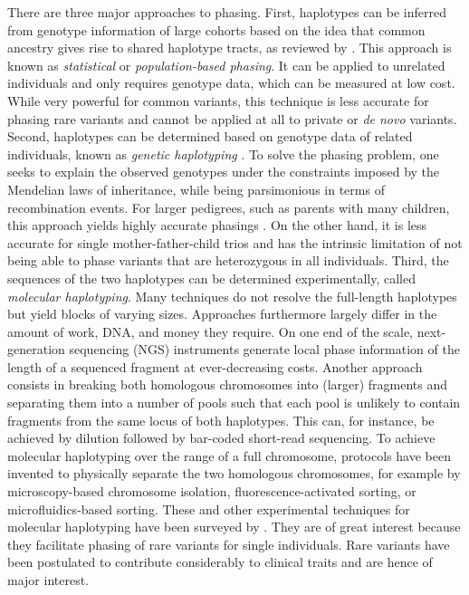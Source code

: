 There are three major approaches to phasing.
First, haplotypes can be inferred from genotype information of large cohorts based on the idea that common ancestry gives rise to shared haplotype tracts, as reviewed by \cite{Browning2011, loh2016fast, loh2016reference}.
This approach is known as \emph{statistical} or \emph{population-based phasing}.
It can be applied to unrelated individuals and only requires genotype data, which can be measured at low cost.
While very powerful for common variants, this technique is less accurate for phasing rare variants and cannot be applied at all to private or \textit{de novo} variants.
%
Second, haplotypes can be determined based on genotype data of related individuals, known as \emph{genetic haplotyping} \citep{Glusman2014}.
To solve the phasing problem, one seeks to explain the observed genotypes under the constraints imposed by the Mendelian laws of inheritance, while being parsimonious in terms of recombination events.
For larger pedigrees, such as parents with many children, this approach yields highly accurate phasings \citep{Roach2011, abecasis2002merlin, williams2010rapid}.
On the other hand, it is less accurate for single mother-father-child trios and has the intrinsic limitation of not being able to phase variants that are heterozygous in all individuals.
%
Third, the sequences of the two haplotypes can be determined experimentally, called \emph{molecular haplotyping}.
Many techniques do not resolve the full-length haplotypes but yield blocks of varying sizes.
Approaches furthermore largely differ in the amount of work, DNA, and money they require.
On one end of the scale, next-generation sequencing (NGS) instruments generate local phase information of the length of a sequenced fragment at ever-decreasing costs.
Another approach consists in breaking both homologous chromosomes into (larger) fragments and separating them into a number of pools such that each pool is unlikely to contain fragments from the same locus of both haplotypes.
This can, for instance, be achieved by dilution followed by bar-coded short-read sequencing.
To achieve molecular haplotyping over the range of a full chromosome, protocols have been invented to physically separate the two homologous chromosomes, for example by microscopy-based chromosome isolation, fluorescence-activated sorting, or microfluidics-based sorting.
These and other experimental techniques for molecular haplotyping have been surveyed by \cite{Snyder2015}.
They are of great interest because they facilitate phasing of rare variants for single individuals.
Rare variants have been postulated to contribute considerably to clinical traits and are hence of major interest.

